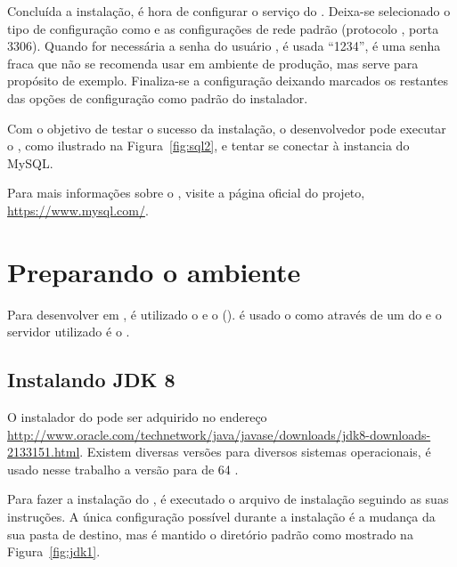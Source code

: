
Concluída a instalação, é hora de configurar o serviço do . Deixa-se selecionado o tipo de configuração como  e as configurações de rede padrão (protocolo , porta 3306). Quando for necessária a senha do usuário , é usada “1234”, é uma senha fraca que não se recomenda usar em ambiente de produção, mas serve para propósito de exemplo. Finaliza-se a configuração deixando marcados os restantes das opções de configuração como padrão do instalador.

Com o objetivo de testar o sucesso da instalação, o desenvolvedor pode executar o , como ilustrado na Figura~\ref{fig:sql2}, e tentar se conectar à instancia do MySQL.


Para mais informações sobre o , visite a página oficial do projeto, \url{https://www.mysql.com/}.

\section{Preparando o ambiente }

Para desenvolver em , é utilizado o  e o  (). é usado o  como  através de um  do  e o servidor  utilizado é o .

\subsection{Instalando JDK 8}

O instalador do  pode ser adquirido no endereço \url{http://www.oracle.com/technetwork/java/javase/downloads/jdk8-downloads-2133151.html}. Existem diversas versões para diversos sistemas operacionais, é usado nesse trabalho a versão para  de 64 . 

Para fazer a instalação do , é executado o arquivo de instalação seguindo as suas instruções. A única configuração possível durante a instalação é a mudança da sua pasta de destino, mas é mantido o diretório padrão como mostrado na Figura~\ref{fig:jdk1}.


